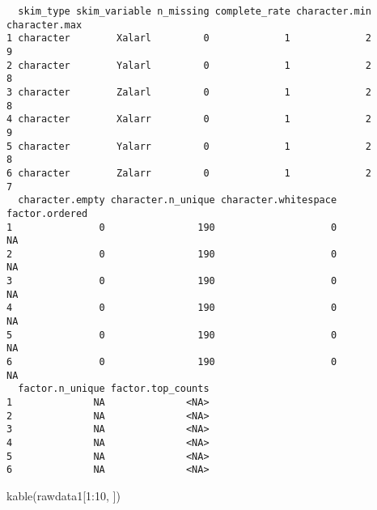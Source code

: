 \documentclass[
  letterpaper,
  DIV=11,
  numbers=noendperiod]{scrartcl}
\newenvironment{Shaded}{\begin{snugshade}}{\end{snugshade}}
\newcommand{\DecValTok}[1]{\textcolor[rgb]{0.68,0.00,0.00}{#1}}
\newcommand{\FunctionTok}[1]{\textcolor[rgb]{0.28,0.35,0.67}{#1}}
\newcommand{\NormalTok}[1]{\textcolor[rgb]{0.00,0.23,0.31}{#1}}
\newcommand{\SpecialCharTok}[1]{\textcolor[rgb]{0.37,0.37,0.37}{#1}}
\begin{document}
\begin{verbatim}
  skim_type skim_variable n_missing complete_rate character.min character.max
1 character        Xalarl         0             1             2             9
2 character        Yalarl         0             1             2             8
3 character        Zalarl         0             1             2             8
4 character        Xalarr         0             1             2             9
5 character        Yalarr         0             1             2             8
6 character        Zalarr         0             1             2             7
  character.empty character.n_unique character.whitespace factor.ordered
1               0                190                    0             NA
2               0                190                    0             NA
3               0                190                    0             NA
4               0                190                    0             NA
5               0                190                    0             NA
6               0                190                    0             NA
  factor.n_unique factor.top_counts
1              NA              <NA>
2              NA              <NA>
3              NA              <NA>
4              NA              <NA>
5              NA              <NA>
6              NA              <NA>
\end{verbatim}

\begin{Shaded}
\begin{Highlighting}[]
\FunctionTok{kable}\NormalTok{(rawdata1[}\DecValTok{1}\SpecialCharTok{:}\DecValTok{10}\NormalTok{, ])}
\end{Highlighting}
\end{Shaded}
\end{document}
